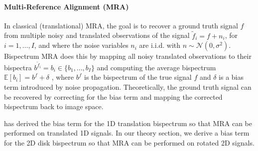 \paragraph{Multi-Reference Alignment (MRA)}
In classical (translational) MRA, the goal is to recover a ground truth signal $f$ from multiple noisy and translated observations of the signal $\tilde{f}_i = f + n_i$, for $i=1, \ldots, I$, and where the noise variables $n_i$ are i.i.d. with $n \sim \mathcal{N}(0, \sigma^2)$. Bispectrum MRA does this by mapping all noisy translated observations to their bispectra $b^{\tilde{f}_i}=b_i \in \{b_1, ..., b_I\}$ and computing the average bispectrum $\mathbb{E}[b_i] = b^f + \delta$ , where $b^f$ is the bispectrum of the true signal $f$ and $\delta$ is a bias term introduced by noise propagation. Theoretically, the ground truth signal can be recovered by correcting for the bias term and mapping the corrected bispectrum back to image space.

\cite{bendory2018bispectrum} has derived the bias term for the 1D translation bispectrum so that MRA can be performed on translated 1D signals. In our theory section, we derive a bias term for the 2D disk bispectrum so that MRA can be performed on rotated 2D signals.
